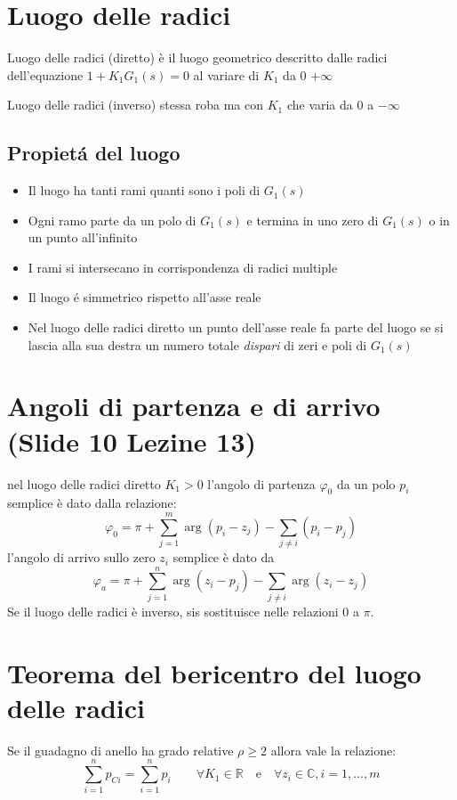 \documentclass{article}
\begin{document}
\section{Luogo delle radici}
Luogo delle radici (diretto) \`e il luogo geometrico descritto dalle radici dell'equazione $1+K_1G_1(s) = 0$ al variare di $K_1$ da 0 $+\infty$

Luogo delle radici (inverso) stessa roba ma con $K_1$ che varia da 0 a $-\infty$

\subsection{Propiet\'a del luogo}
\begin{itemize}
    \item Il luogo ha tanti rami quanti sono i poli di $G_1(s)$
    \item Ogni ramo parte da un polo di $G_1(s)$ e termina in uno zero di $G_1(s)$ o in un punto all'infinito
    \item I rami si intersecano in corrispondenza di radici multiple
    \item Il luogo \'e simmetrico rispetto all'asse reale
    \item Nel luogo delle radici diretto un punto dell'asse reale fa parte del luogo se si lascia alla sua destra un numero totale \textit{dispari} di zeri e poli di $G_1(s)$
\end{itemize}


\section{Angoli di partenza e di arrivo (Slide 10 Lezine 13)}
nel luogo delle radici diretto $K_1 > 0$ l'angolo di partenza $\varphi_0$ da un polo $p_i$ semplice \`e dato dalla relazione:
\[ \varphi_0 = \pi + \sum\limits_{j=1}^m \arg(p_i - z_j) - \sum\limits_{j\neq i} (p_i - p_j) \]
l'angolo di arrivo sullo zero $z_i$ semplice \`e dato da
\[ \varphi_a = \pi + \sum\limits_{j=1}^n \arg(z_i - p_j) - \sum\limits_{j\neq i} \arg(z_i - z_j)\]
Se il luogo delle radici \`e inverso, sis sostituisce nelle relazioni 0 a $\pi$.

\section{Teorema del bericentro del luogo delle radici}
Se il guadagno di anello ha grado relative $\rho \ge 2$ allora vale la relazione:
\[ \sum\limits_{i=1}^n p_{Ci} = \sum\limits_{i=1}^n p_i \qquad \forall K_1 \in \mathbb{R} \quad \text{e} \quad \forall z_i \in \mathbb{C}, i=1,\ldots,m\]
\end{document}
